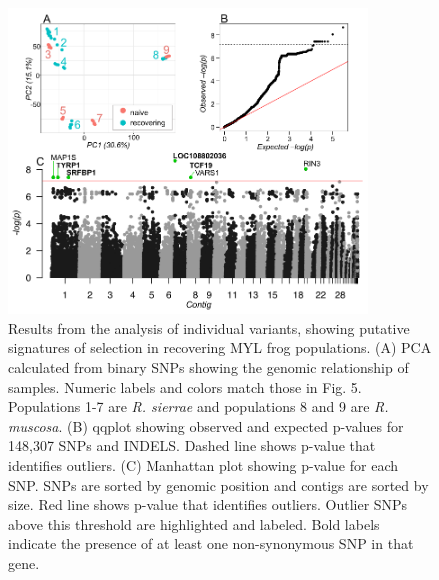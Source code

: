 \documentclass[9pt,twoside,lineno]{pnas-new}
\begin{document}
\begin{figure}

{\centering \includegraphics[width=0.85\textwidth]{figures/pca_qq_manhattan.png}

}

\caption{\label{fig-selectionresults}Results from the analysis of
individual variants, showing putative signatures of selection in
recovering MYL frog populations. (A) PCA calculated from binary SNPs
showing the genomic relationship of samples. Numeric labels and colors
match those in Fig. 5. Populations 1-7 are
\emph{R. sierrae} and populations 8 and 9 are \emph{R. muscosa}. (B)
qqplot showing observed and expected p-values for 148,307 SNPs and
INDELS. Dashed line shows p-value that identifies outliers. (C)
Manhattan plot showing p-value for each SNP. SNPs are sorted by genomic
position and contigs are sorted by size. Red line shows p-value that
identifies outliers. Outlier SNPs above this threshold are highlighted
and labeled. Bold labels indicate the presence of at least one
non-synonymous SNP in that gene.}

\end{figure}\clearpage

\newpage
\end{document}
